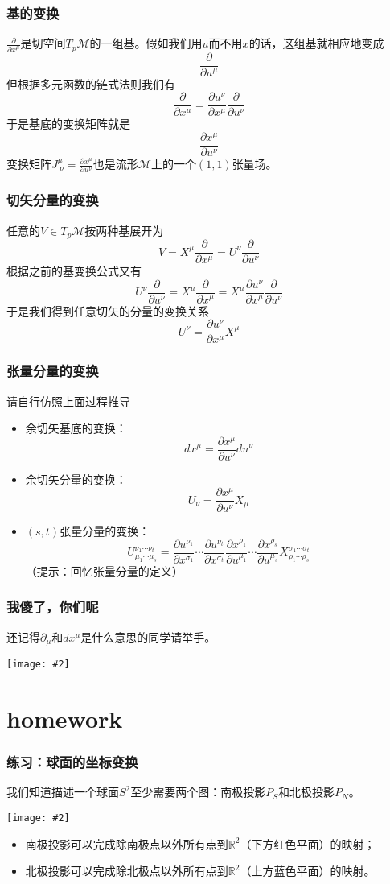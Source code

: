 \documentclass[CJK]{beamer}
\newcommand{\reals}{\mathbb{R}}
\newcommand{\mani}{\mathcal{M}}
\newcommand{\cpic}[2]{
\begin{center}
\texttt{[image: \#2]}
\end{center}
}
\begin{document}
\begin{frame}
\frametitle{\bch 基的变换 \ech}
\bch
$\frac{\partial}{\partial x^\mu}$是切空间$T_p\mani$的一组基。假如我们用$u$而不用$x$的话，这组基就相应地变成
$$
\frac{\partial}{\partial u^\mu}
$$
但根据多元函数的链式法则我们有{\color{blue}
$$
\frac{\partial}{\partial x^\mu} = \frac{\partial u^\nu}{\partial x^\mu} \frac{\partial}{\partial u^\nu}
$$}
于是基底的变换矩阵就是
$$
\frac{\partial x^\mu}{\partial u^\nu} 
$$
变换矩阵$J^\mu_{\ \nu} = \frac{\partial x^\mu}{\partial u^\nu} $也是流形$\mani$上的一个$(1,1)$张量场。
\ech
\end{frame}

\begin{frame}
\frametitle{\bch 切矢分量的变换 \ech}
\bch
任意的$V \in T_p \mani$按两种基展开为
$$V = X^\mu \frac{\partial}{\partial x^\mu}  = U^\nu \frac{\partial}{\partial u^\nu}$$
根据之前的基变换公式又有
$$
U^\nu \frac{\partial}{\partial u^\nu} = X^\mu \frac{\partial}{\partial x^\mu}  = X^\mu \frac{\partial u^\nu}{\partial x^\mu} \frac{\partial}{\partial u^\nu}
$$
于是我们得到任意切矢的分量的变换关系
$$
U^\nu = \frac{\partial u^\nu}{\partial x^\mu} X^\mu 
$$
\ech
\end{frame}


\begin{frame}
\frametitle{\bch 张量分量的变换 \ech}
\bch
请自行仿照上面过程推导
\begin{itemize}
\item 余切矢基底的变换：$$dx^\mu = \frac{\partial x^\mu}{\partial u^\nu} du^\nu$$
\item 余切矢分量的变换：$$U_\nu = \frac{\partial x^\mu}{\partial u^\nu} X_\mu$$
\item $(s,t)$张量分量的变换：$$U^{\nu_1\cdots \nu_t}_{\mu_1\cdots \mu_s} = \frac{\partial u^{\nu_1}}{\partial x^{\sigma_1}} \cdots \frac{\partial u^{\nu_t}}{\partial x^{\sigma_t}} \frac{\partial x^{\rho_1}}{\partial u^{\mu_1} }\cdots \frac{\partial x^{\rho_s}}{\partial u^{\mu_s}} X^{\sigma_1\cdots \sigma_t}_{\rho_1\cdots \rho_s}
$$
（提示：回忆张量分量的定义）
\end{itemize}
\ech
\end{frame}

\begin{frame}
\frametitle{\bch 我傻了，你们呢 \ech}
\bch
还记得$\partial_\mu$和$dx^\mu$是什么意思的同学请举手。
\cpic{0.3}{sad}
\ech
\end{frame}

\section{homework}
\begin{frame}
\frametitle{\bch 练习：球面的坐标变换 \ech}
\bch
我们知道描述一个球面$S^2$至少需要两个图：南极投影$P_S$和北极投影$P_N$。
\cpic{0.11}{seph}
\begin{itemize}
\item
南极投影可以完成除南极点以外所有点到$\reals^2$（下方红色平面）的映射；
\item
北极投影可以完成除北极点以外所有点到$\reals^2$（上方蓝色平面）的映射。
\end{itemize}
\ech
\end{frame}
\end{document}
